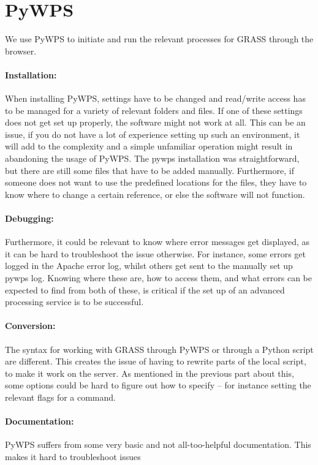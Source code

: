 \section{PyWPS}
We use PyWPS to initiate and run the relevant processes for GRASS through the browser. 

\paragraph{Installation: }When installing PyWPS, settings have to be changed and read/write access has to be managed for a variety of relevant folders and files. If one of these settings does not get set up properly, the software might not work at all. This can be an issue, if you do not have a lot of experience setting up such an environment, it will add to the complexity and a simple unfamiliar operation might result in abandoning the usage of PyWPS.
The pywps installation was straightforward, but there are still some files that have to be added manually. Furthermore, if someone does not want to use the predefined locations for the files, they have to know where to change a certain reference, or else the software will not function.

\paragraph{Debugging:} Furthermore, it could be relevant to know where error messages get displayed, as it can be hard to troubleshoot the issue otherwise. For instance, some errors get logged in the Apache error log, whilst others get sent to the manually set up pywps log. Knowing where these are, how to access them, and what errors can be expected to find from both of these, is critical if the set up of an advanced processing service is to be successful. 

\paragraph{Conversion:} The syntax for working with GRASS through PyWPS or through a Python script are different. This creates the issue of having to rewrite parts of the local script, to make it work on the server. As mentioned in the previous part about this, some options could be hard to figure out how to specify – for instance setting the relevant flags for a command.

\paragraph{Documentation:} PyWPS suffers from some very basic and not all-too-helpful documentation. This makes it hard to troubleshoot issues

